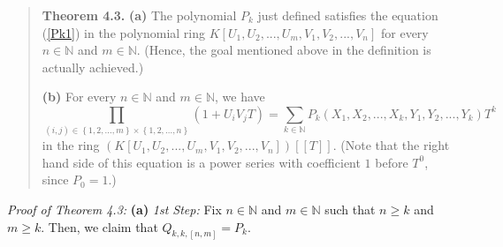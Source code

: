 \documentclass[12pt,final,notitlepage,onecolumn,german]{article}%
\begin{document}
\begin{quote}
\textbf{Theorem 4.3.} \textbf{(a)} The polynomial $P_{k}$ just defined
satisfies the equation (\ref{Pk1}) in the polynomial ring $K\left[
U_{1},U_{2},...,U_{m},V_{1},V_{2},...,V_{n}\right]  $ for every $n\in
\mathbb{N}$ and $m\in\mathbb{N}$. (Hence, the goal mentioned above in the
definition is actually achieved.)

\textbf{(b)} For every $n\in\mathbb{N}$ and $m\in\mathbb{N}$, we have%
\begin{equation}
\prod_{\left(  i,j\right)  \in\left\{  1,2,...,m\right\}  \times\left\{
1,2,...,n\right\}  }\left(  1+U_{i}V_{j}T\right)  =\sum_{k\in\mathbb{N}}%
P_{k}\left(  X_{1},X_{2},...,X_{k},Y_{1},Y_{2},...,Y_{k}\right)  T^{k}
\label{Pk2}%
\end{equation}
in the ring $\left(  K\left[  U_{1},U_{2},...,U_{m},V_{1},V_{2},...,V_{n}%
\right]  \right)  \left[  \left[  T\right]  \right]  $. (Note that the right
hand side of this equation is a power series with coefficient $1$ before
$T^{0}$, since $P_{0}=1$.)
\end{quote}

\textit{Proof of Theorem 4.3:} \textbf{(a)} \textit{1st Step:} Fix
$n\in\mathbb{N}$ and $m\in\mathbb{N}$ such that $n\geq k$ and $m\geq k$. Then,
we claim that $Q_{k,k,\left[  n,m\right]  }=P_{k}$.
\end{document}
